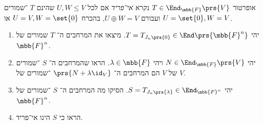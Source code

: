 \documentclass[a4paper,10pt,twoside,openany]{book}
\begin{document}
\begin{definition}
אופרטור
$T \in \End_{\mbb{F}}\prs{V}$
נקרא
\emph{אי־פריד}
אם לכל
$U,W \leq V$
שהינם
$T$%
־שמורים ועבורם
$U \oplus W = V$,
בהכרח
$U = V, W = \set{0}$
או
$U = \set{0}, W = V$.
\end{definition}

\begin{exercisechap}\label{exercise:jordan_invariant}
\begin{enumerate}
\item יהי
$T = T_{J_n\prs{0}} \in \End\prs{\mbb{F}^n}$.
מיצאו את המרחבים ה־%
$T$
שמורים של
$\mbb{F}^n$.

\item יהי
$N \in \End_{\mbb{F}}\prs{V}$
ויהי
$\lambda \in \mbb{F}$.
הראו שהמרחבים ה־%
$S$
־שמורים של
$V$
הם המרחבים ה־%
$\prs{N + \lambda \id_V}$
־שמורים של
$V$.

\item יהי
$S = T_{J_n\prs{\lambda}} \in \End_{\mbb{F}^n}$.
הסיקו מה המרחבים ה־%
$S$%
־שמורים של
$\mbb{F}^n$.

\item
הראו כי
$S$
הינו אי־פריד.
\end{enumerate}
\end{exercisechap}
\end{document}
